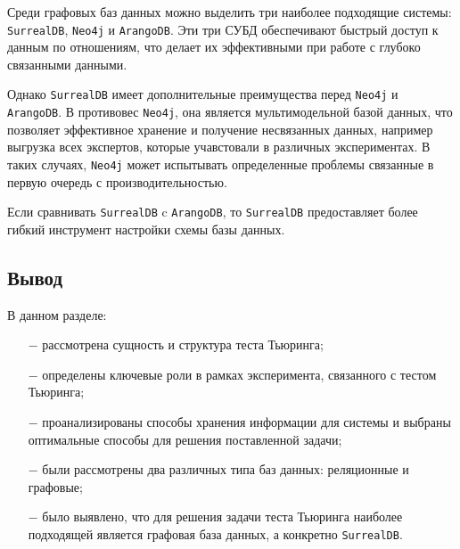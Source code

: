Среди графовых баз данных можно выделить три наиболее подходящие системы: \texttt{SurrealDB}, \texttt{Neo4j} и \texttt{ArangoDB}.
Эти три СУБД обеспечивают быстрый доступ к данным по отношениям, что делает их эффективными при работе с глубоко связанными данными.

Однако \texttt{SurrealDB} имеет дополнительные преимущества перед \texttt{Neo4j} и \texttt{ArangoDB}. 
В противовес \texttt{Neo4j}, она является мультимодельной базой данных, что позволяет эффективное хранение и получение несвязанных данных, например выгрузка всех экспертов, которые учавстовали в различных экспериментах.
В таких случаях, \texttt{Neo4j} может испытывать определенные проблемы связанные в первую очередь с производительностью.

Если сравнивать \texttt{SurrealDB} c \texttt{ArangoDB}, то \texttt{SurrealDB} предоставляет более гибкий инструмент настройки схемы базы данных.

\subsection*{Вывод}

В данном разделе:
\begin{itemize}
  \item[$-$] рассмотрена сущность и структура теста Тьюринга;
  \item[$-$] определены ключевые роли в рамках эксперимента, связанного с тестом Тьюринга;
  \item[$-$] проанализированы способы хранения информации для системы и выбраны оптимальные способы для решения поставленной задачи;
  \item[$-$] были рассмотрены два различных типа баз данных: реляционные и графовые;
  \item[$-$] было выявлено, что для решения задачи теста Тьюринга наиболее подходящей является графовая база данных, а конкретно \texttt{SurrealDB}.
\end{itemize}


